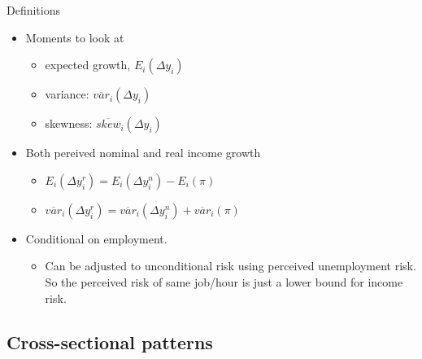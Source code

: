 \documentclass{beamer}
\begin{document}
\begin{frame}{Definitions}
	\begin{itemize}
		\item Moments to look at 
		\begin{itemize}
			\item expected growth, $E_i (\Delta y_i)$
			\item variance: $\overline {var}_i(\Delta y_i)$
			\item skewness: $\overline {skew}_i(\Delta y_i)$
		\end{itemize}
		\item Both pereived nominal and real income growth 
		\begin{itemize}
			\item $E_i(\Delta y^r_i) =E_i(\Delta y_i^n) - E_i(\pi)$
			\item $\overline{var}_i(\Delta y_i^r) =\overline {var}_i(\Delta y_i^n) +  \overline {var}_i(\pi)$
		\end{itemize}
		\item Conditional on employment.
		\begin{itemize}
			\item Can be adjusted to unconditional risk using perceived unemployment risk. So the perceived risk of same job/hour is just a lower bound for income risk. 
		\end{itemize}
	\end{itemize}
\end{frame}

\subsection{Cross-sectional patterns}
\end{document}
